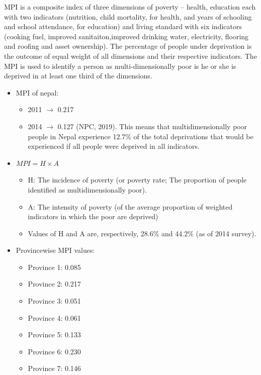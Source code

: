 \documentclass[
]{book}
\providecommand{\tightlist}{%
  \setlength{\itemsep}{0pt}\setlength{\parskip}{0pt}}
\begin{document}
MPI is a composite index of three dimensions of poverty -- health, education each with two indicators (nutrition, child mortality, for health, and years of schooling and school attendance, for education) and living standard with six indicators (cooking fuel, improved sanitaiton,improved drinking water, electricity, flooring and roofing and asset ownership). The percentage of people under deprivation is the outcome of equal weight of all dimensions and their respective indicators. The MPI is used to identify a person as multi-dimensionally poor is he or she is deprived in at least one third of the dimensions.

\begin{itemize}
\tightlist
\item
  MPI of nepal:

  \begin{itemize}
  \tightlist
  \item
    2011 \(\longrightarrow\) 0.217
  \item
    2014 \(\longrightarrow\) 0.127 (NPC, 2019). This means that multidimensionally poor people in Nepal experience 12.7\% of the total deprivations that would be experienced if all people were deprived in all indicators.
  \end{itemize}
\item
  \(MPI = H \times A\)

  \begin{itemize}
  \tightlist
  \item
    H: The incidence of poverty (or poverty rate; The proportion of people identified as multidimensionally poor).
  \item
    A: The intensity of poverty (of the average proportion of weighted indicators in which the poor are deprived)
  \item
    Values of H and A are, respectively, 28.6\% and 44.2\% (as of 2014 survey).
  \end{itemize}
\item
  Provincewise MPI values:

  \begin{itemize}
  \tightlist
  \item
    Province 1: 0.085
  \item
    Province 2: 0.217
  \item
    Province 3: 0.051
  \item
    Province 4: 0.061
  \item
    Province 5: 0.133
  \item
    Province 6: 0.230
  \item
    Province 7: 0.146
  \end{itemize}
\end{itemize}
\end{document}
